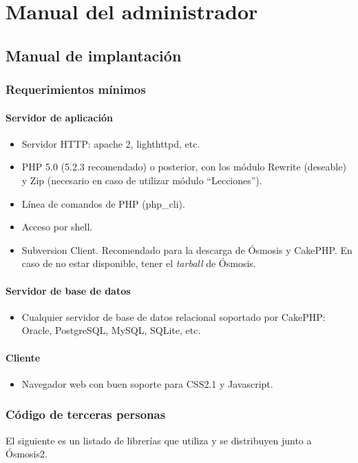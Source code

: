\chapter{Manual del administrador}
\label{Manual}
\section{Manual de implantación}
\subsection{Requerimientos mínimos}

\subsubsection{Servidor de aplicación}
\begin{itemize}
	\item Servidor HTTP: apache 2, lighthttpd, etc.
	\item PHP 5.0 (5.2.3 recomendado) o posterior, con los módulo Rewrite (deseable) y Zip (necesario en caso de utilizar módulo ``Lecciones'').
	\item Línea de comandos de PHP (php\_cli).
	\item Acceso por shell.
	\item Subversion Client. Recomendado para la descarga de Ósmosis y CakePHP. En caso de no estar disponible, tener el \emph{tarball} de Ósmosis.
\end{itemize}

\subsubsection{Servidor de base de datos}
\begin{itemize}
	\item Cualquier servidor de base de datos relacional soportado por CakePHP: Oracle, PostgreSQL, MySQL, SQLite, etc.
\end{itemize}

\subsubsection{Cliente}
\begin{itemize}
	\item Navegador web con buen soporte para CSS2.1 y Javascript.
\end{itemize}

\subsection{Código de terceras personas}
El siguiente es un listado de librerías que utiliza y se distribuyen junto a Ósmosis2.

